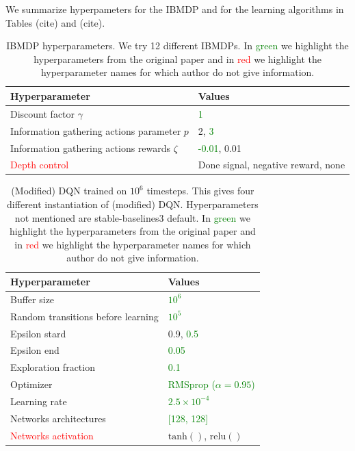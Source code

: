 We summarize hyperpameters for the IBMDP and for the learning algorithms in Tables (cite) and (cite).

\begin{table}[h]
    \centering
    \caption{IBMDP hyperparameters. We try 12 different IBMDPs. In \textcolor{green}{green} we highlight the hyperparameters from the original paper and in \textcolor{red}{red} we highlight the hyperparameter names for which author do not give information.}
    \begin{tabular}{ll}
    \toprule
    \textbf{Hyperparameter} & \textbf{Values}\\
    \midrule
    Discount factor $\gamma$ & \textcolor{green}{1} \\
    Information gathering actions parameter $p$ & 2, \textcolor{green}{3} \\
    Information gathering actions rewards $\zeta$ & \textcolor{green}{-0.01}, 0.01 \\
    \textcolor{red}{Depth control} & Done signal, negative reward, none \\ 
    \bottomrule
    \end{tabular}
    \end{table}

\begin{table}[h]
    \centering
    \caption{(Modified) DQN trained on $10^6$ timesteps. This gives four different instantiation of (modified) DQN. Hyperparameters not mentioned are stable-baselines3 default. In \textcolor{green}{green} we highlight the hyperparameters from the original paper and in \textcolor{red}{red} we highlight the hyperparameter names for which author do not give information.}
    \begin{tabular}{ll}
    \toprule
    \textbf{Hyperparameter} & \textbf{Values}\\
    \midrule
    Buffer size & \textcolor{green}{$10^6$} \\
    Random transitions before learning & \textcolor{green}{$10^5$} \\
    Epsilon stard & 0.9, \textcolor{green}{0.5} \\
    Epsilon end & \textcolor{green}{0.05} \\
    Exploration fraction & \textcolor{green}{0.1} \\
    Optimizer & \textcolor{green}{RMSprop ($\alpha = 0.95$)}\\
    Learning rate & \textcolor{green}{$2.5\times10^{-4}$}\\
    Networks architectures & \textcolor{green}{[128, 128]}\\
    \textcolor{red}{Networks activation} & $\operatorname{tanh()}$, $\operatorname{relu()}$\\
    \bottomrule
    \end{tabular}
    \end{table}


